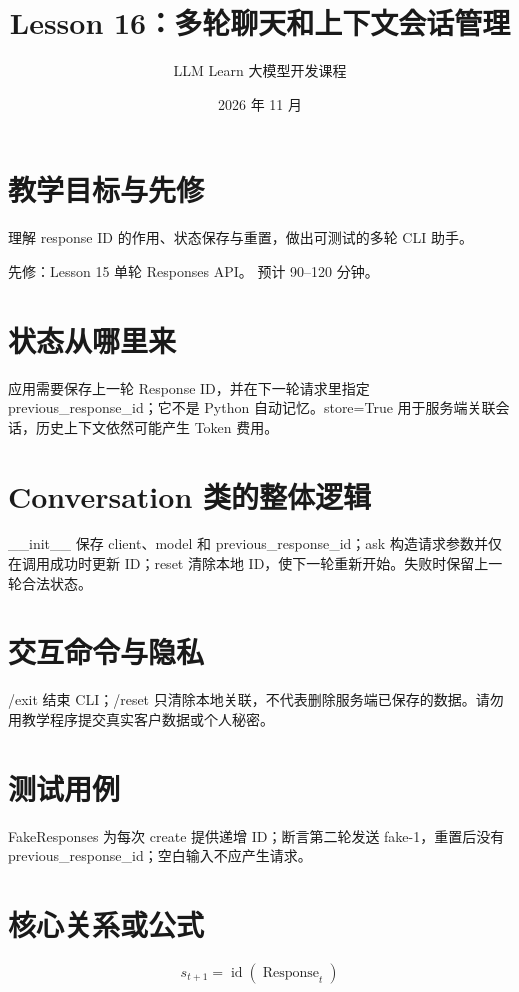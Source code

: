 \documentclass[UTF8,11pt,a4paper]{ctexart}
\begin{document}
\title{Lesson 16：多轮聊天和上下文会话管理}
\author{LLM Learn 大模型开发课程}
\date{2026 年 11 月}
\maketitle
\tableofcontents
\newpage
\section{教学目标与先修}
理解 response ID 的作用、状态保存与重置，做出可测试的多轮 CLI 助手。\par
先修：Lesson 15 单轮 Responses API。 预计 90–120 分钟。\par
\section{状态从哪里来}
应用需要保存上一轮 Response ID，并在下一轮请求里指定 previous\_response\_id；它不是 Python 自动记忆。store=True 用于服务端关联会话，历史上下文依然可能产生 Token 费用。

\section{Conversation 类的整体逻辑}
\_\_init\_\_ 保存 client、model 和 previous\_response\_id；ask 构造请求参数并仅在调用成功时更新 ID；reset 清除本地 ID，使下一轮重新开始。失败时保留上一轮合法状态。

\section{交互命令与隐私}
/exit 结束 CLI；/reset 只清除本地关联，不代表删除服务端已保存的数据。请勿用教学程序提交真实客户数据或个人秘密。

\section{测试用例}
FakeResponses 为每次 create 提供递增 ID；断言第二轮发送 fake-1，重置后没有 previous\_response\_id；空白输入不应产生请求。

\section{核心关系或公式}
\[
s_{t+1}=\operatorname{id}(\operatorname{Response}_{t})
\]
\end{document}
